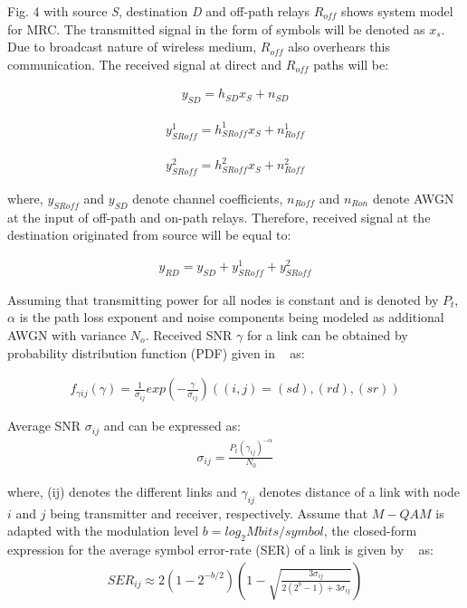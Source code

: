 \documentclass{sig-alternate}
\begin{document}
Fig. 4 with source \textit{S}, destination \textit{D} and off-path relays $R_{off}$ shows system model for MRC. The transmitted signal in the form of symbols will be denoted as $x_s$. Due to broadcast nature of wireless medium, $R_{off}$ also overhears this communication. The received signal at direct and $R_{off}$ paths will be:

\begin{eqnarray}
y_{SD}=h_{SD}x_{S} + n_{SD}
\end{eqnarray}

\begin{eqnarray}
y_{SRoff}^1=h_{SRoff}^1x_{S} + n_{Roff}^1
\end{eqnarray}

\begin{eqnarray}
y_{SRoff}^2=h_{SRoff}^2x_{S} + n_{Roff}^2
\end{eqnarray}

where, $y_{SRoff}$ and $y_{SD}$ denote channel coefficients, $n_{Roff}$ and $n_{Ron}$ denote AWGN at the input of off-path and on-path relays. Therefore, received signal at the destination originated from source will be equal to:

\begin{eqnarray}
y_{RD}=y_{SD}+ y_{SRoff}^{1}+y_{SRoff}^{2}
\end{eqnarray}

Assuming that transmitting power for all nodes is constant and is denoted by $P_t$, $\alpha$ is the path loss exponent and noise components being modeled as additional AWGN with variance $N_o$. Received SNR $\gamma$ for a link can be obtained by probability distribution function (PDF) given in ~\cite{6} as:

\begin{eqnarray}
f_{\gamma ij}(\gamma)= \frac{1}{\sigma_{ij}} exp (-\frac{\gamma}{\sigma_{ij}})     ((i,j)=(sd),(rd),(sr))
\end{eqnarray}

Average SNR $\sigma_{ij}$ and can be expressed as:
\begin{eqnarray}
\sigma_{ij}=\frac{P_{t}(\gamma_{ij})^{-\alpha}}{N_0}
\end{eqnarray}

where, (ij) denotes the different links and $\gamma_{ij}$ denotes distance of a link with node $i$ and $j$ being transmitter and receiver, respectively.
Assume that $M-QAM$ is adapted with the modulation level $b=log_2M bits/symbol$, the closed-form expression for the average symbol error-rate (SER) of a link is given by ~\cite{6} as:
 \begin{eqnarray}
SER_{ij}\approx2(1-2^{-b/2})(1-\sqrt{\frac{3\sigma_{ij}}{2(2^b-1)+3\sigma_{ij}}})
\end{eqnarray}
\end{document}
